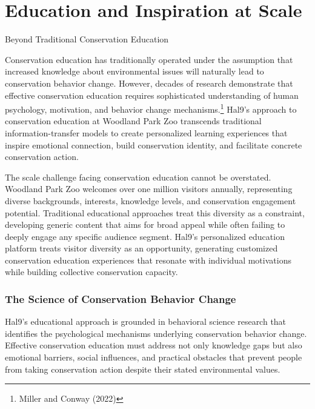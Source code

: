 \documentclass[
  Letterpaper,
]{scrbook}
\begin{document}

\chapter{Education and Inspiration at
Scale}\label{education-and-inspiration-at-scale}

Beyond Traditional Conservation Education

\hfill\break

Conservation education has traditionally operated under the assumption
that increased knowledge about environmental issues will naturally lead
to conservation behavior change. However, decades of research
demonstrate that effective conservation education requires sophisticated
understanding of human psychology, motivation, and behavior change
mechanisms.\footnote{Miller and Conway (2022)} Hal9's approach to
conservation education at Woodland Park Zoo transcends traditional
information-transfer models to create personalized learning experiences
that inspire emotional connection, build conservation identity, and
facilitate concrete conservation action.

The scale challenge facing conservation education cannot be overstated.
Woodland Park Zoo welcomes over one million visitors annually,
representing diverse backgrounds, interests, knowledge levels, and
conservation engagement potential. Traditional educational approaches
treat this diversity as a constraint, developing generic content that
aims for broad appeal while often failing to deeply engage any specific
audience segment. Hal9's personalized education platform treats visitor
diversity as an opportunity, generating customized conservation
education experiences that resonate with individual motivations while
building collective conservation capacity.

\subsection{The Science of Conservation Behavior
Change}\label{the-science-of-conservation-behavior-change}

Hal9's educational approach is grounded in behavioral science research
that identifies the psychological mechanisms underlying conservation
behavior change. Effective conservation education must address not only
knowledge gaps but also emotional barriers, social influences, and
practical obstacles that prevent people from taking conservation action
despite their stated environmental values.
\end{document}
